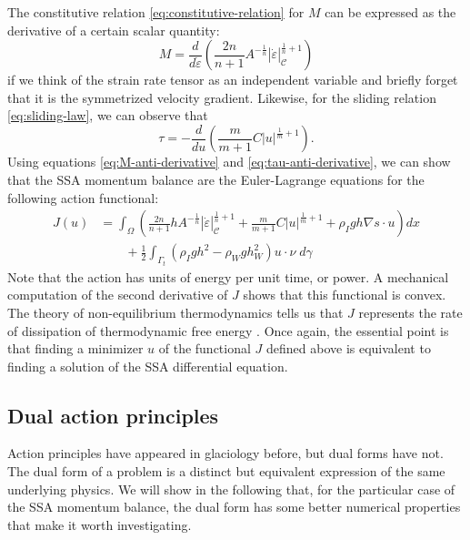 \documentclass{article}
\theoremstyle{definition}
\theoremstyle{plain}
\begin{document}
The constitutive relation \eqref{eq:constitutive-relation} for $M$ can be expressed as the derivative of a certain scalar quantity:
\begin{equation}
    M = \frac{d}{d\dot\varepsilon}\left(\frac{2n}{n + 1}A^{-\frac{1}{n}}|\dot\varepsilon|_{\mathscr C}^{\frac{1}{n} + 1}\right)
    \label{eq:M-anti-derivative}
\end{equation}
if we think of the strain rate tensor as an independent variable and briefly forget that it is the symmetrized velocity gradient.
Likewise, for the sliding relation \eqref{eq:sliding-law}, we can observe that
\begin{equation}
    \tau = -\frac{d}{du}\left(\frac{m}{m + 1}C|u|^{\frac{1}{m} + 1}\right).
    \label{eq:tau-anti-derivative}
\end{equation}
Using equations \eqref{eq:M-anti-derivative} and \eqref{eq:tau-anti-derivative}, we can show that the SSA momentum balance are the Euler-Lagrange equations for the following action functional:
\begin{align}
    J(u) & = \int_\Omega\left(\frac{2n}{n + 1}hA^{-\frac{1}{n}}|\dot\varepsilon|_{\mathscr{C}}^{\frac{1}{n} + 1} + \frac{m}{m + 1}C|u|^{\frac{1}{m} + 1} + \rho_I gh\nabla s\cdot u\right)dx  \nonumber \\
    & \qquad + \frac{1}{2}\int_{\Gamma_t}\left(\rho_Igh^2 - \rho_Wgh_W^2\right)u\cdot\nu\; d\gamma
    \label{eq:ssa-primal-action}
\end{align}
Note that the action has units of energy per unit time, or power.
A mechanical computation of the second derivative of $J$ shows that this functional is convex.
The theory of non-equilibrium thermodynamics tells us that $J$ represents the rate of dissipation of thermodynamic free energy \citep{edelen1972nonlinear}.
Once again, the essential point is that finding a minimizer $u$ of the functional $J$ defined above is equivalent to finding a solution of the SSA differential equation.


\subsection{Dual action principles}
\label{subsec:dual-action-principles}

Action principles have appeared in glaciology before, but dual forms have not.
The dual form of a problem is a distinct but equivalent expression of the same underlying physics.
We will show in the following that, for the particular case of the SSA momentum balance, the dual form has some better numerical properties that make it worth investigating.
\end{document}
